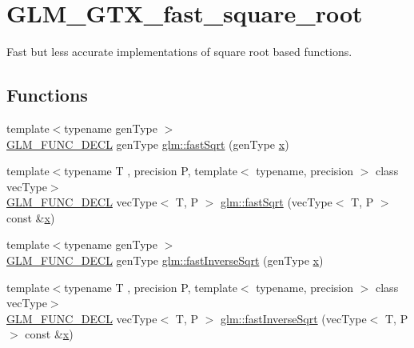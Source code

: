 \hypertarget{group__gtx__fast__square__root}{}\section{G\+L\+M\+\_\+\+G\+T\+X\+\_\+fast\+\_\+square\+\_\+root}
\label{group__gtx__fast__square__root}


Fast but less accurate implementations of square root based functions.  


\subsection*{Functions}
\begin{DoxyCompactItemize}
\item 
{\footnotesize template$<$typename gen\+Type $>$ }\\\mbox{\hyperlink{setup_8hpp_ab2d052de21a70539923e9bcbf6e83a51}{G\+L\+M\+\_\+\+F\+U\+N\+C\+\_\+\+D\+E\+CL}} gen\+Type \mbox{\hyperlink{group__gtx__fast__square__root_ga6c460e9414a50b2fc455c8f64c86cdc9}{glm\+::fast\+Sqrt}} (gen\+Type \mbox{\hyperlink{glad_8h_a92d0386e5c19fb81ea88c9f99644ab1d}{x}})
\item 
{\footnotesize template$<$typename T , precision P, template$<$ typename, precision $>$ class vec\+Type$>$ }\\\mbox{\hyperlink{setup_8hpp_ab2d052de21a70539923e9bcbf6e83a51}{G\+L\+M\+\_\+\+F\+U\+N\+C\+\_\+\+D\+E\+CL}} vec\+Type$<$ T, P $>$ \mbox{\hyperlink{group__gtx__fast__square__root_gaad9f601bbc3faa04dda384e4c4e1592c}{glm\+::fast\+Sqrt}} (vec\+Type$<$ T, P $>$ const \&\mbox{\hyperlink{glad_8h_a92d0386e5c19fb81ea88c9f99644ab1d}{x}})
\item 
{\footnotesize template$<$typename gen\+Type $>$ }\\\mbox{\hyperlink{setup_8hpp_ab2d052de21a70539923e9bcbf6e83a51}{G\+L\+M\+\_\+\+F\+U\+N\+C\+\_\+\+D\+E\+CL}} gen\+Type \mbox{\hyperlink{group__gtx__fast__square__root_ga7f081b14d9c7035c8714eba5f7f75a8f}{glm\+::fast\+Inverse\+Sqrt}} (gen\+Type \mbox{\hyperlink{glad_8h_a92d0386e5c19fb81ea88c9f99644ab1d}{x}})
\item 
{\footnotesize template$<$typename T , precision P, template$<$ typename, precision $>$ class vec\+Type$>$ }\\\mbox{\hyperlink{setup_8hpp_ab2d052de21a70539923e9bcbf6e83a51}{G\+L\+M\+\_\+\+F\+U\+N\+C\+\_\+\+D\+E\+CL}} vec\+Type$<$ T, P $>$ \mbox{\hyperlink{group__gtx__fast__square__root_ga903878071f92e51e551791e584a171a1}{glm\+::fast\+Inverse\+Sqrt}} (vec\+Type$<$ T, P $>$ const \&\mbox{\hyperlink{glad_8h_a92d0386e5c19fb81ea88c9f99644ab1d}{x}})

\end{DoxyCompactItemize}

